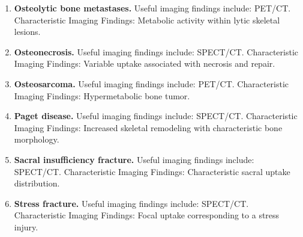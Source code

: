 \begin{enumerate}[leftmargin=*,itemsep=0.45em,topsep=0.4em]
\item \textbf{Osteolytic bone metastases.} Useful imaging findings include: PET/CT. Characteristic Imaging Findings: Metabolic activity within lytic skeletal lesions.
\item \textbf{Osteonecrosis.} Useful imaging findings include: SPECT/CT. Characteristic Imaging Findings: Variable uptake associated with necrosis and repair.
\item \textbf{Osteosarcoma.} Useful imaging findings include: PET/CT. Characteristic Imaging Findings: Hypermetabolic bone tumor.
\item \textbf{Paget disease.} Useful imaging findings include: SPECT/CT. Characteristic Imaging Findings: Increased skeletal remodeling with characteristic bone morphology.
\item \textbf{Sacral insufficiency fracture.} Useful imaging findings include: SPECT/CT. Characteristic Imaging Findings: Characteristic sacral uptake distribution.
\item \textbf{Stress fracture.} Useful imaging findings include: SPECT/CT. Characteristic Imaging Findings: Focal uptake corresponding to a stress injury.
\end{enumerate}

